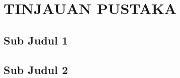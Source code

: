 \section{TINJAUAN PUSTAKA}

\subsection{Sub Judul 1}
\PlaceholderParShort

\subsection{Sub Judul 2}
\PlaceholderParShort